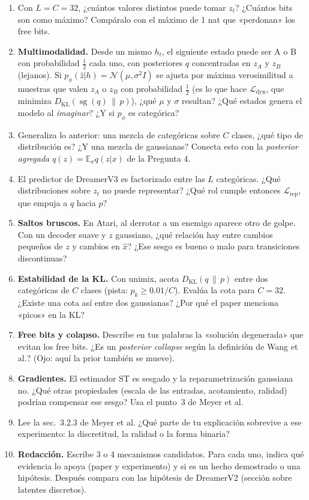 \documentclass[11pt,a4paper]{article}
\newcommand{\KL}{D_{\mathrm{KL}}}
\newcommand{\E}{\mathbb{E}}
\newcommand{\N}{\mathcal{N}}
\newcommand{\sg}{\operatorname{sg}}
\begin{document}
\begin{guia}
\begin{enumerate}[leftmargin=*]
  \item Con $L=C=32$, ¿cuántos valores distintos puede tomar $z_t$? ¿Cuántos bits son como máximo? Compáralo con el máximo de 1 nat que «perdonan» los free bits.
  \item \textbf{Multimodalidad.} Desde un mismo $h_t$, el siguiente estado puede ser A o B con probabilidad $\tfrac12$ cada uno, con posteriores $q$ concentradas en $z_A$ y $z_B$ (lejanos). Si $p_\phi(\hat z|h)=\N(\mu,\sigma^2 I)$ se ajusta por máxima verosimilitud a muestras que valen $z_A$ o $z_B$ con probabilidad $\tfrac12$ (es lo que hace $\mathcal L_{\mathrm{dyn}}$, que minimiza $\KL(\sg(q)\,\|\,p)$), ¿qué $\mu$ y $\sigma$ resultan? ¿Qué estados genera el modelo al \emph{imaginar}? ¿Y si $p_\phi$ es categórica?
  \item Generaliza lo anterior: una mezcla de categóricas sobre $C$ clases, ¿qué tipo de distribución es? ¿Y una mezcla de gaussianas? Conecta esto con la \emph{posterior agregada} $q(z)=\E_x q(z|x)$ de la Pregunta 4.
  \item El predictor de DreamerV3 es factorizado entre las $L$ categóricas. ¿Qué distribuciones sobre $z_t$ no puede representar? ¿Qué rol cumple entonces $\mathcal L_{\mathrm{rep}}$, que empuja a $q$ hacia $p$?
  \item \textbf{Saltos bruscos.} En Atari, al derrotar a un enemigo aparece otro de golpe. Con un decoder suave y $z$ gaussiano, ¿qué relación hay entre cambios pequeños de $z$ y cambios en $\hat x$? ¿Ese sesgo es bueno o malo para transiciones discontinuas?
  \item \textbf{Estabilidad de la KL.} Con unimix, acota $\KL(q\,\|\,p)$ entre dos categóricas de $C$ clases (pista: $p_k\ge 0.01/C$). Evalúa la cota para $C=32$. ¿Existe una cota así entre dos gaussianas? ¿Por qué el paper menciona «picos» en la KL?
  \item \textbf{Free bits y colapso.} Describe en tus palabras la «solución degenerada» que evitan los free bits. ¿Es un \emph{posterior collapse} según la definición de Wang et al.? (Ojo: aquí la prior también se mueve).
  \item \textbf{Gradientes.} El estimador ST es sesgado y la reparametrización gaussiana no. ¿Qué otras propiedades (escala de las entradas, acotamiento, ralidad) podrían compensar ese sesgo? Usa el punto~3 de Meyer et al.
  \item Lee la sec.~3.2.3 de Meyer et al. ¿Qué parte de tu explicación sobrevive a ese experimento: la discretitud, la ralidad o la forma binaria?
  \item \textbf{Redacción.} Escribe 3 o 4 mecanismos candidatos. Para cada uno, indica qué evidencia lo apoya (paper y experimento) y si es un hecho demostrado o una hipótesis. Después compara con las hipótesis de DreamerV2 (sección sobre latentes discretos).
\end{enumerate}
\end{guia}
\end{document}
